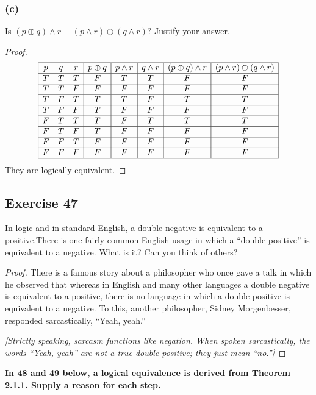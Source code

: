 \documentclass[14pt]{extarticle}
\begin{document}
\subsubsection{(c)}
Is $(p \oplus q) \wedge r \equiv (p \wedge r) \oplus (q \wedge r)$? Justify your answer.

\begin{proof}
$$
\begin{array}{|ccc|c|c|c|c|c|}
\hline
p & q & r & p \oplus q & p \wedge r & q \wedge r & (p \oplus q) \wedge r & (p \wedge r) \oplus (q \wedge r) \\
\hline
T & T & T & F & T & T & F & F \\
\hline
T & T & F & F & F & F & F & F \\
\hline
T & F & T & T & T & F & T & T \\
\hline
T & F & F & T & F & F & F & F \\
\hline
F & T & T & T & F & T & T & T \\
\hline
F & T & F & T & F & F & F & F \\
\hline
F & F & T & F & F & F & F & F \\
\hline
F & F & F & F & F & F & F & F \\
\hline
\end{array}
$$
They are logically equivalent.
\end{proof}

\subsection{Exercise 47}
In logic and in standard English, a double negative is equivalent to a positive.There is one fairly common English usage in which a “double positive” is equivalent to a negative. What is it? Can you think of others?

\begin{proof} There is a famous story about a philosopher who once gave a talk in which he observed that whereas in English and many other languages a double negative is equivalent to a positive, there is no language in which a double positive is equivalent to a negative. To this, another philosopher, Sidney
Morgenbesser, responded sarcastically, “Yeah, yeah.”

{\it [Strictly speaking, sarcasm functions like negation. When spoken sarcastically, the words “Yeah, yeah” are not a true double positive; they just mean “no.”]}
\end{proof}

{\bf In 48 and 49 below, a logical equivalence is derived from Theorem 2.1.1. Supply a reason for each step.}
\end{document}

